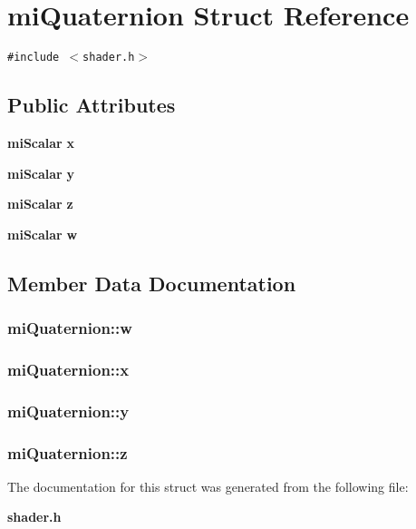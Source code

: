 \section{mi\-Quaternion Struct Reference}
\label{structmiQuaternion}
{\tt \#include $<$shader.h$>$}

\subsection*{Public Attributes}
\begin{CompactItemize}
\item 
{\bf mi\-Scalar} {\bf x}
\item 
{\bf mi\-Scalar} {\bf y}
\item 
{\bf mi\-Scalar} {\bf z}
\item 
{\bf mi\-Scalar} {\bf w}
\end{CompactItemize}


\subsection{Member Data Documentation}
\subsubsection{ {\bf mi\-Quaternion::w}}\label{structmiQuaternion_o3}


\subsubsection{ {\bf mi\-Quaternion::x}}\label{structmiQuaternion_o0}


\subsubsection{ {\bf mi\-Quaternion::y}}\label{structmiQuaternion_o1}


\subsubsection{ {\bf mi\-Quaternion::z}}\label{structmiQuaternion_o2}




The documentation for this struct was generated from the following file:\begin{CompactItemize}
\item 
{\bf shader.h}\end{CompactItemize}
